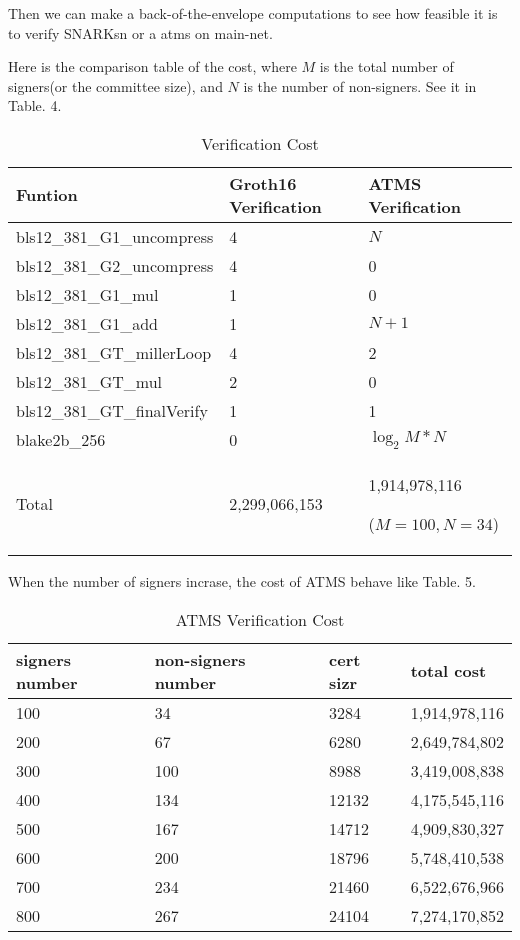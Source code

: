 \documentclass{article}
\begin{document}
Then we can make a back-of-the-envelope computations to see how feasible it is to verify SNARKsn or a atms on main-net.

Here is the comparison table of the cost, where $M$ is the total number of signers(or the committee size), and $N$ is the number of non-signers. See it in Table. 4.

\begin{table}[H]
    \centering
    \begin{tabular}{p{5cm}|p{4cm}|p{4cm}} \hline
         Funtion & Groth16 Verification & ATMS Verification  \\ \hline
         bls12\_381\_G1\_uncompress&  4 & $N$ \\ \hline
         bls12\_381\_G2\_uncompress&  4 & 0 \\ \hline
         bls12\_381\_G1\_mul&  1 & 0 \\ \hline
         bls12\_381\_G1\_add&  1 & $N+1$ \\ \hline
         bls12\_381\_GT\_millerLoop  & 4 & 2 \\ \hline
         bls12\_381\_GT\_mul         & 2 & 0 \\ \hline
         bls12\_381\_GT\_finalVerify & 1 & 1 \\ \hline
         blake2b\_256 & 0 &  $\log_2M *N$  \\ \hline
         Total & 2,299,066,153 & 1,914,978,116
         
         ($M=100, N=34$) \\ \hline
    \end{tabular}
    \caption{Verification Cost}
    \label{tab:my_label}
\end{table}

When the number of signers incrase, the cost of ATMS behave like Table. 5.

\begin{table}[H]
    \centering
    \begin{tabular}{p{3cm}|p{3cm}|p{3cm}|p{3cm}} \hline
         signers number& non-signers number& cert sizr &total cost  \\ \hline
         100&  34& 3284 &1,914,978,116 \\ \hline
         200&  67& 6280 &2,649,784,802 \\ \hline
         300&  100& 8988&3,419,008,838 \\ \hline
         400&  134& 12132&4,175,545,116 \\ \hline
         500&  167& 14712&4,909,830,327 \\ \hline
         600&  200& 18796&5,748,410,538 \\ \hline
         700&  234& 21460&6,522,676,966 \\ \hline
         800&  267& 24104&7,274,170,852 \\ \hline
    \end{tabular}
    \caption{ATMS Verification Cost}
    \label{tab:my_label}
\end{table}
\end{document}
